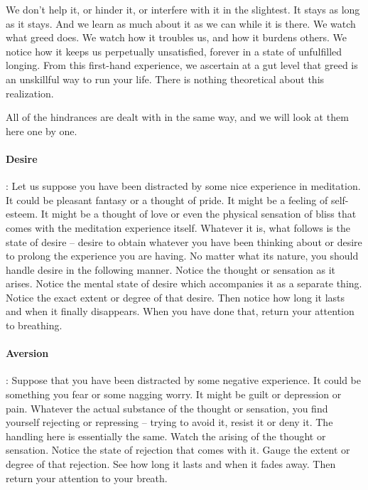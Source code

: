 We don't help it, or hinder it, or interfere with it in the slightest. It stays
as long as it stays. And we learn as much about it as we can while it is there.
We watch what greed does. We watch how it troubles us, and how it burdens
others. We notice how it keeps us perpetually unsatisfied, forever in a state of
unfulfilled longing. From this first-hand experience, we ascertain at a gut
level that greed is an unskillful way to run your life. There is nothing
theoretical about this realization.

All of the hindrances are dealt with in the same way, and we will look at them
here one by one.

\paragraph*{Desire}: Let us suppose you have been distracted by some nice experience in meditation. It could be pleasant fantasy or a thought
of pride. It might be a feeling of self-esteem. It might be a thought of love or even the physical sensation of bliss that comes with
the meditation experience itself. Whatever it is, what follows is the state of desire -- desire to obtain whatever you have been
thinking about or desire to prolong the experience you are having. No matter what its nature, you should handle desire in the
following manner. Notice the thought or sensation as it arises. Notice the mental state of desire which accompanies it as a separate
thing. Notice the exact extent or degree of that desire. Then notice how long it lasts and when it finally disappears. When you
have done that, return your attention to breathing.

\paragraph*{Aversion}: Suppose that you have been distracted by some negative experience. It
could be something you fear or some nagging worry. It might be guilt or
depression or pain. Whatever the actual substance of the thought or sensation,
you find yourself rejecting or repressing -- trying to avoid it, resist it or
deny it. The handling here is essentially the same. Watch the arising of the
thought or sensation. Notice the state of rejection that comes with it. Gauge
the extent or degree of that rejection. See how long it lasts and when it fades
away. Then return your attention to your breath.

